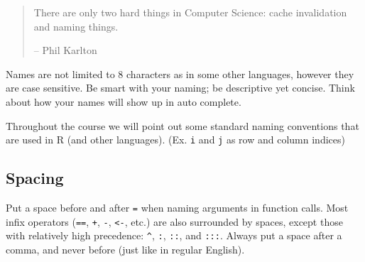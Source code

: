 \documentclass[]{book}
\newenvironment{Shaded}{\begin{snugshade}}{\end{snugshade}}
\newcommand{\KeywordTok}[1]{\textcolor[rgb]{0.13,0.29,0.53}{\textbf{#1}}}
\newcommand{\DecValTok}[1]{\textcolor[rgb]{0.00,0.00,0.81}{#1}}
\newcommand{\StringTok}[1]{\textcolor[rgb]{0.31,0.60,0.02}{#1}}
\newcommand{\CommentTok}[1]{\textcolor[rgb]{0.56,0.35,0.01}{\textit{#1}}}
\newcommand{\OperatorTok}[1]{\textcolor[rgb]{0.81,0.36,0.00}{\textbf{#1}}}
\newcommand{\NormalTok}[1]{#1}
\theoremstyle{definition}
\theoremstyle{definition}
\theoremstyle{definition}
\theoremstyle{remark}
\begin{document}
\begin{quote}
There are only two hard things in Computer Science: cache invalidation
and naming things.

-- Phil Karlton
\end{quote}

Names are not limited to 8 characters as in some other languages,
however they are case sensitive. Be smart with your naming; be
descriptive yet concise. Think about how your names will show up in auto
complete.

Throughout the course we will point out some standard naming conventions
that are used in R (and other languages). (Ex. \texttt{i} and \texttt{j}
as row and column indices)

\begin{Shaded}
\end{Shaded}

\subsection{Spacing}\label{spacing}

Put a space before and after \texttt{=} when naming arguments in
function calls. Most infix operators (\texttt{==}, \texttt{+},
\texttt{-}, \texttt{\textless{}-}, etc.) are also surrounded by spaces,
except those with relatively high precedence: \texttt{\^{}}, \texttt{:},
\texttt{::}, and \texttt{:::}. Always put a space after a comma, and
never before (just like in regular English).
\end{document}
